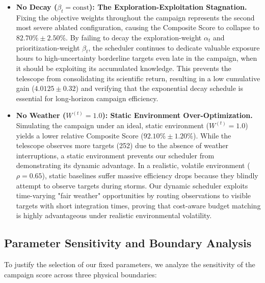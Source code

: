 \documentclass[11pt,a4paper]{article}
\begin{document}
\begin{itemize}
    \item \textbf{No Decay ($\beta_t = \text{const}$): The Exploration-Exploitation Stagnation.}
    Fixing the objective weights throughout the campaign represents the second most severe ablated configuration, causing the Composite Score to collapse to $82.70\% \pm 2.50\%$. By failing to decay the exploration-weight $\alpha_t$ and prioritization-weight $\beta_t$, the scheduler continues to dedicate valuable exposure hours to high-uncertainty borderline targets even late in the campaign, when it should be exploiting its accumulated knowledge. This prevents the telescope from consolidating its scientific return, resulting in a low cumulative gain ($4.0125 \pm 0.32$) and verifying that the exponential decay schedule is essential for long-horizon campaign efficiency.
    
    \item \textbf{No Weather ($W^{(t)} = 1.0$): Static Environment Over-Optimization.}
    Simulating the campaign under an ideal, static environment ($W^{(t)} = 1.0$) yields a lower relative Composite Score ($92.10\% \pm 1.20\%$). While the telescope observes more targets (252) due to the absence of weather interruptions, a static environment prevents our scheduler from demonstrating its dynamic advantage. In a realistic, volatile environment ($\rho = 0.65$), static baselines suffer massive efficiency drops because they blindly attempt to observe targets during storms. Our dynamic scheduler exploits time-varying "fair weather" opportunities by routing observations to visible targets with short integration times, proving that cost-aware budget matching is highly advantageous under realistic environmental volatility.
\end{itemize}

\subsection{Parameter Sensitivity and Boundary Analysis}
\label{sec:sensitivity}

To justify the selection of our fixed parameters, we analyze the sensitivity of the campaign score across three physical boundaries:
\end{document}
